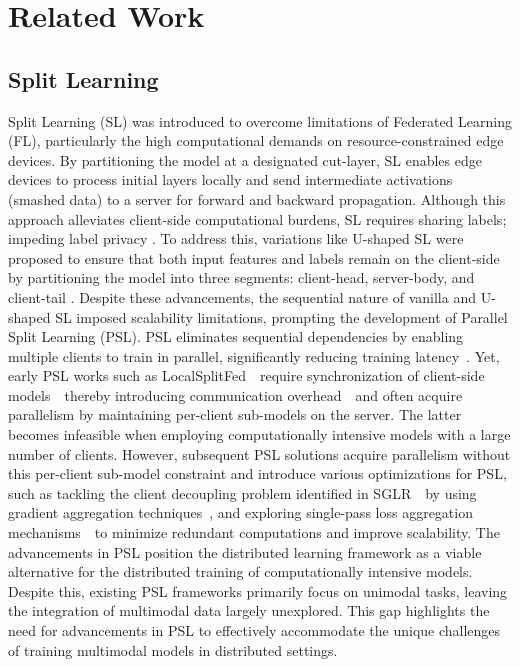 \section{Related Work}
\label{related_work}

\subsection{Split Learning}
Split Learning (SL) was introduced to overcome limitations of Federated Learning (FL), particularly the high computational demands on resource-constrained edge devices. By partitioning the model at a designated cut-layer, SL enables edge devices to process initial layers locally and send intermediate activations (smashed data) to a server for forward and backward propagation. Although this approach alleviates client-side computational burdens, SL requires sharing labels; impeding label privacy \cite{sl}. To address this, variations like U-shaped SL were proposed to ensure that both input features and labels remain on the client-side by partitioning the model into three segments: client-head, server-body, and client-tail \cite{sl,Shuffled-Transformer,MaskSL}. Despite these advancements, the sequential nature of vanilla and U-shaped SL imposed scalability limitations, prompting the development of Parallel Split Learning (PSL). PSL eliminates sequential dependencies by enabling multiple clients to train in parallel, significantly reducing training latency~\cite{privacy-sensitive-psl,CutMixSL,DP-CutMixSL,FedBone,LocalSplitFed}. Yet, early PSL works such as LocalSplitFed~\cite{LocalSplitFed}~require synchronization of client-side models~\textendash~thereby introducing communication overhead~\textendash~and often acquire parallelism by maintaining per-client sub-models on the server. The latter becomes infeasible when employing computationally intensive models with a large number of clients. However, subsequent PSL solutions acquire parallelism without this per-client sub-model constraint and introduce various optimizations for PSL, such as tackling the client decoupling problem identified in SGLR~\cite{sglr}~by using gradient aggregation techniques~\cite{sglr,Mix2SFL,EPSL}, and exploring single-pass loss aggregation mechanisms~\cite{sasl}~to minimize redundant computations and improve scalability. The advancements in PSL position the distributed learning framework as a viable alternative for the distributed training of computationally intensive models. Despite this, existing PSL frameworks primarily focus on unimodal tasks, leaving the integration of multimodal data largely unexplored. This gap highlights the need for advancements in PSL to effectively accommodate the unique challenges of training multimodal models in distributed settings.

